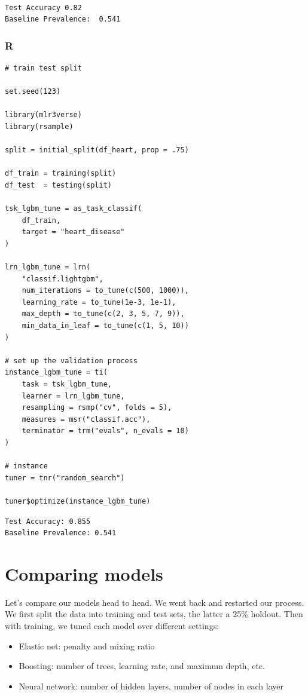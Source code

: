 \documentclass[
  letterpaper,
]{krantz}
\providecommand{\tightlist}{%
  \setlength{\itemsep}{0pt}\setlength{\parskip}{0pt}}\usepackage{longtable,booktabs,array}
\begin{document}
\begin{verbatim}

Test Accuracy 0.82 
Baseline Prevalence:  0.541
\end{verbatim}

\subsubsection{R}

\begin{verbatim}
# train test split

set.seed(123)

library(mlr3verse)
library(rsample)

split = initial_split(df_heart, prop = .75)

df_train = training(split)
df_test  = testing(split)

tsk_lgbm_tune = as_task_classif(
    df_train,
    target = "heart_disease"
)

lrn_lgbm_tune = lrn(
    "classif.lightgbm",
    num_iterations = to_tune(c(500, 1000)),
    learning_rate = to_tune(1e-3, 1e-1),
    max_depth = to_tune(c(2, 3, 5, 7, 9)),
    min_data_in_leaf = to_tune(c(1, 5, 10))
)

# set up the validation process
instance_lgbm_tune = ti(
    task = tsk_lgbm_tune,
    learner = lrn_lgbm_tune,
    resampling = rsmp("cv", folds = 5),
    measures = msr("classif.acc"),
    terminator = trm("evals", n_evals = 10)
)

# instance
tuner = tnr("random_search")

tuner$optimize(instance_lgbm_tune)
\end{verbatim}

\begin{verbatim}
Test Accuracy: 0.855
Baseline Prevalence: 0.541
\end{verbatim}

\section{Comparing models}\label{sec-ml-compare}

Let's compare our models head to head. We went back and restarted our
process. We first split the data into training and test sets, the latter
a 25\% holdout. Then with training, we tuned each model over different
settings:

\begin{itemize}
\tightlist
\item
  Elastic net: penalty and mixing ratio
\item
  Boosting: number of trees, learning rate, and maximum depth, etc.
\item
  Neural network: number of hidden layers, number of nodes in each layer
\end{itemize}
\end{document}
